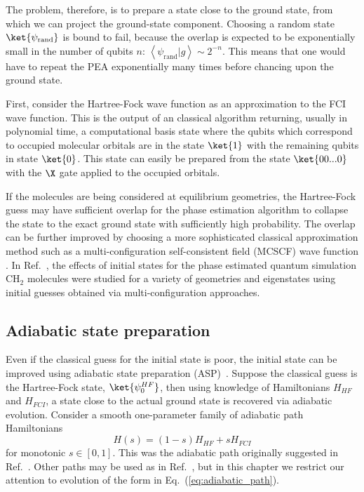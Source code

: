 \documentclass[11pt,oneside,final]{huthesis}%
\begin{document}
The problem, therefore, is to prepare a state close to the ground state, from
which we can project the ground-state component. Choosing a random state
$\ket{\psi_\mathrm{rand}}$ is bound to fail, because the overlap  is expected to
be exponentially small in the number of qubits $n$: $\left\langle
\psi_\mathrm{rand} | g \right\rangle \sim 2^{-n}$. This means that one would
have to repeat the PEA exponentially many times before chancing upon the ground
state.


First, consider the Hartree-Fock wave function as an approximation to the FCI wave function.  This is the output of an classical algorithm returning, usually in polynomial time, a computational basis state where the qubits which correspond to occupied molecular orbitals are in the state $\ket{1}$ with the remaining qubits in state $\ket{0}$. This state can easily be prepared from the state $\ket{00...0}$ with the $\X$ gate applied to the occupied orbitals.

If the molecules are being considered at equilibrium geometries, the Hartree-Fock
guess may have sufficient overlap for the phase estimation algorithm to collapse the state to the exact ground state with sufficiently high probability. The overlap can be further improved by choosing a more sophisticated classical approximation method such as a multi-configuration self-consistent field (MCSCF) wave function \cite{Wang08,Wang09}. In Ref.~\cite{Veis10}, the effects of initial states for the phase estimated quantum simulation CH$_2$ molecules {were} studied for a variety of geometries and eigenstates using initial guesses obtained via multi-configuration approaches.

\subsection{Adiabatic state preparation}\label{sec:ASP}
Even if the classical guess for the initial state is poor, the initial state can be improved using adiabatic state preparation (ASP)~\cite{Farhi01,Wu02,Aspuru05}.
Suppose the classical guess is the Hartree-Fock state, $\ket{\psi_0^{HF}}$, then using knowledge of Hamiltonians $H_{HF}$ and $ {H}_{FCI}$, a state close to the actual ground state is recovered via adiabatic evolution.  Consider a smooth one-parameter family of adiabatic path Hamiltonians
\begin{equation}
{H(s)}=(1-s) {H}_{HF}+s {H}_{FCI}
\label{eq:adiabatic_path}
\end{equation}
for monotonic $s\in[0,1]$.  This was the adiabatic path originally suggested in Ref.~\cite{Aspuru05}.  Other paths may be used as in Ref.~\cite{Perdomo08}, but in this chapter we restrict our attention to evolution of the form in Eq.~(\ref{eq:adiabatic_path}).
\end{document}
